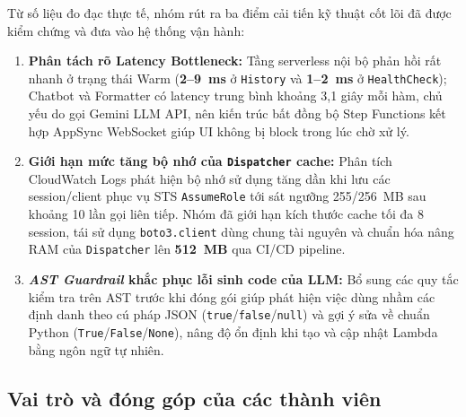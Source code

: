 \documentclass[a4paper,12pt]{article}
\newcommand{\code}[1]{\texttt{#1}}
\begin{document}
Từ số liệu đo đạc thực tế, nhóm rút ra ba điểm cải tiến kỹ thuật cốt lõi đã được kiểm chứng và đưa vào hệ thống vận hành:
\begin{enumerate}[itemsep=3pt,topsep=2pt]
  \item \textbf{Phân tách rõ Latency Bottleneck:} Tầng serverless nội bộ phản hồi rất nhanh ở trạng thái Warm (\textbf{2--9~ms} ở \code{History} và \textbf{1--2~ms} ở \code{HealthCheck}); Chatbot và Formatter có latency trung bình khoảng 3,1 giây mỗi hàm, chủ yếu do gọi Gemini LLM API, nên kiến trúc bất đồng bộ Step Functions kết hợp AppSync WebSocket giúp UI không bị block trong lúc chờ xử lý.
  \item \textbf{Giới hạn mức tăng bộ nhớ của \code{Dispatcher} cache:} Phân tích CloudWatch Logs phát hiện bộ nhớ sử dụng tăng dần khi lưu các session/client phục vụ STS \code{AssumeRole} tới sát ngưỡng 255/256~MB sau khoảng 10 lần gọi liên tiếp. Nhóm đã giới hạn kích thước cache tối đa 8 session, tái sử dụng \code{boto3.client} dùng chung tài nguyên và chuẩn hóa nâng RAM của \code{Dispatcher} lên \textbf{512~MB} qua CI/CD pipeline.
  \item \textbf{\textit{AST Guardrail} khắc phục lỗi sinh code của LLM:} Bổ sung các quy tắc kiểm tra trên AST trước khi đóng gói giúp phát hiện việc dùng nhầm các định danh theo cú pháp JSON (\code{true}/\code{false}/\code{null}) và gợi ý sửa về chuẩn Python (\code{True}/\code{False}/\code{None}), nâng độ ổn định khi tạo và cập nhật Lambda bằng ngôn ngữ tự nhiên.
\end{enumerate}

\subsection{Vai trò và đóng góp của các thành viên}

\begingroup
\setlength{\tabcolsep}{6pt}
\renewcommand{\arraystretch}{1.15}
\fontsize{10.5}{14}\selectfont
\end{document}
